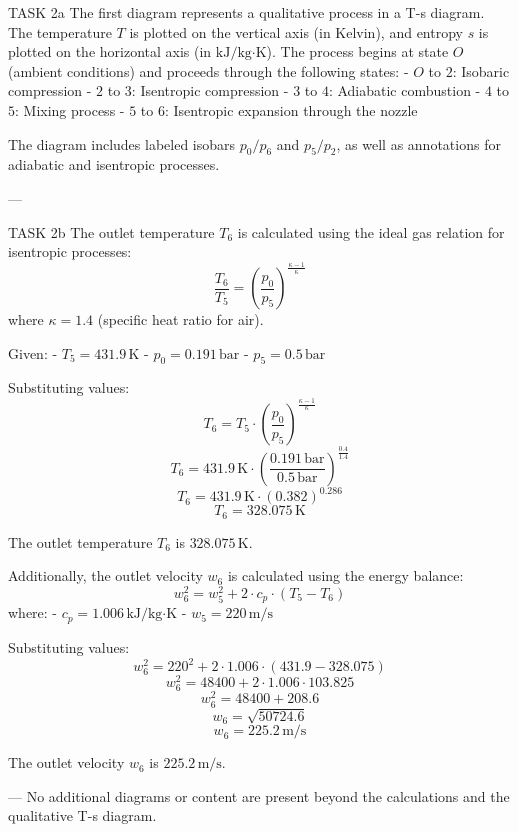 TASK 2a  
The first diagram represents a qualitative process in a T-s diagram. The temperature \( T \) is plotted on the vertical axis (in Kelvin), and entropy \( s \) is plotted on the horizontal axis (in \( \text{kJ}/\text{kg·K} \)). The process begins at state \( O \) (ambient conditions) and proceeds through the following states:  
- \( O \) to \( 2 \): Isobaric compression  
- \( 2 \) to \( 3 \): Isentropic compression  
- \( 3 \) to \( 4 \): Adiabatic combustion  
- \( 4 \) to \( 5 \): Mixing process  
- \( 5 \) to \( 6 \): Isentropic expansion through the nozzle  

The diagram includes labeled isobars \( p_0/p_6 \) and \( p_5/p_2 \), as well as annotations for adiabatic and isentropic processes.  

---

TASK 2b  
The outlet temperature \( T_6 \) is calculated using the ideal gas relation for isentropic processes:  
\[
\frac{T_6}{T_5} = \left( \frac{p_0}{p_5} \right)^{\frac{\kappa - 1}{\kappa}}
\]  
where \( \kappa = 1.4 \) (specific heat ratio for air).  

Given:  
- \( T_5 = 431.9 \, \text{K} \)  
- \( p_0 = 0.191 \, \text{bar} \)  
- \( p_5 = 0.5 \, \text{bar} \)  

Substituting values:  
\[
T_6 = T_5 \cdot \left( \frac{p_0}{p_5} \right)^{\frac{\kappa - 1}{\kappa}}
\]  
\[
T_6 = 431.9 \, \text{K} \cdot \left( \frac{0.191 \, \text{bar}}{0.5 \, \text{bar}} \right)^{\frac{0.4}{1.4}}
\]  
\[
T_6 = 431.9 \, \text{K} \cdot \left( 0.382 \right)^{0.286}
\]  
\[
T_6 = 328.075 \, \text{K}
\]  

The outlet temperature \( T_6 \) is \( 328.075 \, \text{K} \).  

Additionally, the outlet velocity \( w_6 \) is calculated using the energy balance:  
\[
w_6^2 = w_5^2 + 2 \cdot c_p \cdot (T_5 - T_6)
\]  
where:  
- \( c_p = 1.006 \, \text{kJ}/\text{kg·K} \)  
- \( w_5 = 220 \, \text{m/s} \)  

Substituting values:  
\[
w_6^2 = 220^2 + 2 \cdot 1.006 \cdot (431.9 - 328.075)
\]  
\[
w_6^2 = 48400 + 2 \cdot 1.006 \cdot 103.825
\]  
\[
w_6^2 = 48400 + 208.6
\]  
\[
w_6 = \sqrt{50724.6}
\]  
\[
w_6 = 225.2 \, \text{m/s}
\]  

The outlet velocity \( w_6 \) is \( 225.2 \, \text{m/s} \).  

---  
No additional diagrams or content are present beyond the calculations and the qualitative T-s diagram.